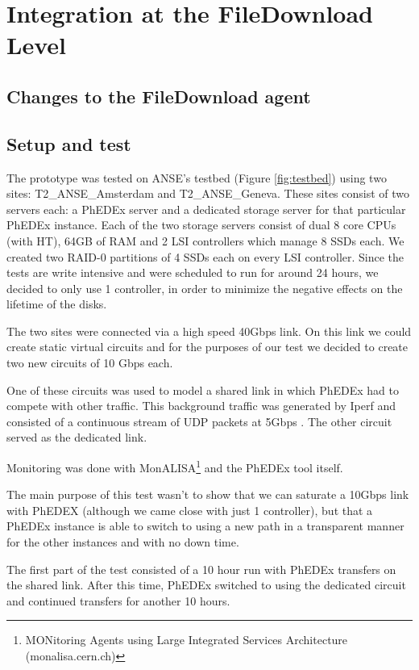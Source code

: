 \section{Integration at the FileDownload Level}

\subsection{Changes to the FileDownload agent}

\subsection{Setup and test}
The prototype was tested on ANSE's testbed (Figure \ref{fig:testbed}) using 
two sites: T2\_ANSE\_Amsterdam and T2\_ANSE\_Geneva. These sites consist of two
 servers each: a PhEDEx server and a dedicated storage server for that particular 
 PhEDEx instance. Each of the two storage servers consist of dual 8 core CPUs 
 (with HT), 64GB of RAM and 2 LSI controllers which manage 8 SSDs each. We created 
 two RAID-0 partitions of 4 SSDs each on every LSI controller. Since the tests are write 
 intensive and were scheduled to run for around 24 hours, we decided to only use 
 1 controller, in order to minimize the negative effects on the lifetime of the disks.

The two sites were connected via a high speed 40Gbps link. On this link we could create
static virtual circuits and for the purposes of our test we decided to create two new
circuits of 10 Gbps each.

One of these circuits was used to model a shared link in which PhEDEx had to compete 
with other traffic. This background traffic was generated by Iperf and consisted of a 
continuous stream of UDP packets at 5Gbps . The other circuit served as the dedicated
link.

Monitoring was done with MonALISA\footnote{MONitoring Agents using Large
 Integrated Services Architecture (monalisa.cern.ch) } and the PhEDEx tool itself.

The main purpose of this test wasn't to show that we can saturate a 10Gbps link with
PhEDEX (although we came close with just 1 controller), but that a PhEDEx instance 
is able to switch to using a new path in a transparent manner for the other instances
and with no down time. 

The first part of the test consisted of a 10 hour run with PhEDEx transfers on the 
shared link. After this time, PhEDEx switched to using the dedicated circuit and
continued transfers for another 10 hours.

